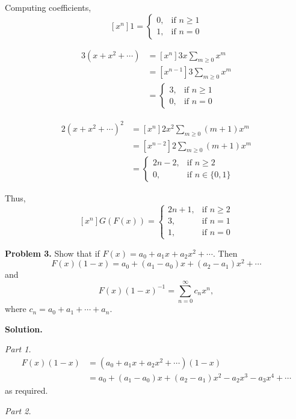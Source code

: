 Computing coefficients,
\[ [x^n]1=
    \begin{cases}
        0, & \text{if } n\geqslant 1 \\
        1, & \text{if } n=0
    \end{cases}
\]

\begin{align*}
    [x^n]3(x+x^2+\cdots)
     & = [x^n] 3x \sum\limits_{m\geqslant 0} x^m   \\
     & = [x^{n-1}]3 \sum\limits_{m\geqslant 0} x^m \\
     & = \begin{cases}
        3, & \text{if } n\geqslant 1 \\
        0, & \text{if } n=0
    \end{cases}
\end{align*}

\begin{align*}
    [x^n]2(x+x^2+\cdots)^2
     & = [x^n]2x^2 \sum\limits_{m\geqslant 0}(m+1)x^m \\
     & = [x^{n-2}]2\sum\limits_{m\geqslant 0}(m+1)x^m \\
     & = \begin{cases}
        2n-2, & \text{if } n\geqslant 2 \\
        0,    & \text{if } n\in\{0,1\}
    \end{cases}
\end{align*}

Thus,
\[ [x^n]G(F(x))
    =\begin{cases}
        2n+1, & \text{if }  n\ge 2 \\
        3,    & \text{if } n=1     \\
        1,    & \text{if } n=0
    \end{cases}
\]

\textbf{Problem 3.} Show that if $ F(x)=a_0+a_1x+a_2x^2+\cdots $. Then
\[ F(x)(1-x)=a_0+(a_1-a_0)x+(a_2-a_1)x^2+\cdots \]
and
\[ F(x)(1-x)^{-1}=\sum\limits_{n=0}^{\infty} c_n x^n, \]
where $ c_n=a_0+a_1+\cdots+a_n $.

\textbf{Solution.}

\emph{Part 1.}
\begin{align*}
    F(x)(1-x)
     & =(a_0+a_1x+a_2x^2+\cdots)(1-x)                      \\
     & =a_0 + (a_1-a_0)x+(a_2-a_1)x^2-a_2x^3-a_3x^4+\cdots
\end{align*}
as required.

\emph{Part 2.}

